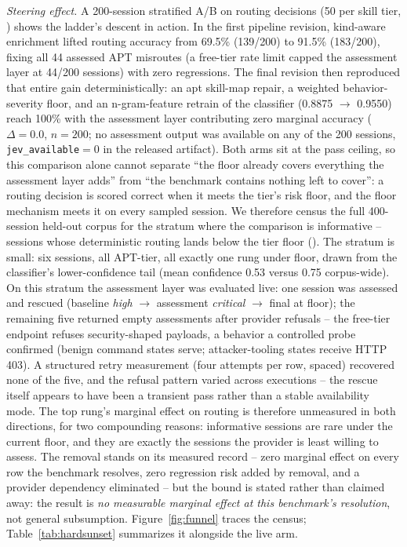 \emph{Steering effect.} A 200-session stratified A/B on routing decisions
(50 per skill tier, ) shows the ladder's descent
in action. In the first pipeline revision, kind-aware enrichment lifted
routing accuracy from 69.5\% (139/200) to 91.5\% (183/200), fixing all 44
assessed APT misroutes (a free-tier rate limit capped the assessment
layer at 44/200 sessions) with zero regressions. The final revision then reproduced that
entire gain deterministically: an apt skill-map repair, a weighted
behavior-severity floor, and an n-gram-feature retrain of the classifier
(0.8875 $\to$ 0.9550) reach 100\% with the assessment layer contributing
zero marginal accuracy ($\Delta = 0.0$, $n=200$; no assessment output
was available on any of the 200 sessions, \texttt{jev\_available}$=0$ in
the released artifact). Both arms sit at the
pass ceiling, so this comparison alone cannot separate ``the floor
already covers everything the assessment layer adds'' from ``the
benchmark contains nothing left to cover'': a routing decision is scored
correct when it meets the tier's risk floor, and the floor mechanism
meets it on every sampled session. We therefore census the full
400-session held-out corpus for the stratum where the comparison is
informative -- sessions whose deterministic routing lands below the tier
floor (). The stratum is small: six sessions,
all APT-tier, all exactly one rung under floor, drawn from the
classifier's lower-confidence tail (mean confidence 0.53 versus 0.75
corpus-wide). On this stratum the assessment layer was evaluated live:
one session was assessed and rescued (baseline \emph{high} $\to$
assessment \emph{critical} $\to$ final at floor); the remaining five
returned empty assessments after provider refusals -- the free-tier
endpoint refuses security-shaped payloads, a behavior a controlled
probe confirmed (benign command states serve; attacker-tooling states
receive HTTP 403). A structured retry measurement (four attempts per
row, spaced) recovered none of the five, and the refusal pattern
varied across executions -- the rescue itself appears to have been a
transient pass rather than a stable availability mode. The top rung's marginal
effect on routing is therefore unmeasured in both directions, for two
compounding reasons: informative sessions are rare under the current
floor, and they are exactly the sessions the provider is least willing
to assess. The removal stands on its measured record -- zero marginal
effect on every row the benchmark resolves, zero regression risk added
by removal, and a provider dependency eliminated -- but the bound is
stated rather than claimed away: the result is \emph{no measurable
marginal effect at this benchmark's resolution}, not general subsumption.
Figure~\ref{fig:funnel} traces the census; Table~\ref{tab:hardsunset}
summarizes it alongside the live arm.


